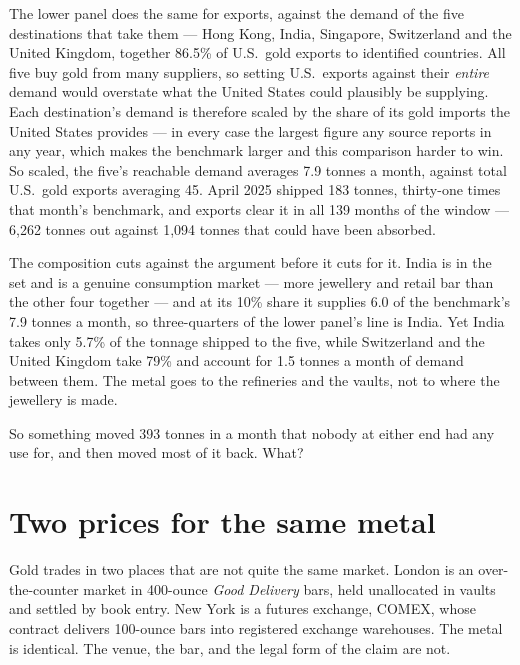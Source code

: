 \documentclass[11pt]{article}
\begin{document}
The lower panel does the same for exports, against the demand of the five
destinations that take them --- Hong Kong, India, Singapore, Switzerland and
the United Kingdom, together 86.5\% of U.S.\ gold exports to identified
countries. All five buy gold from many suppliers, so setting U.S.\ exports
against their \emph{entire} demand would overstate what the United States could
plausibly be supplying. Each destination's demand is therefore scaled by the
share of its gold imports the United States provides --- in every case the
largest figure any source reports in any year, which makes the benchmark larger
and this comparison harder to win. So scaled, the five's
reachable demand averages 7.9 tonnes a month, against total U.S.\ gold exports
averaging 45. April 2025 shipped 183 tonnes, thirty-one times that month's
benchmark, and exports clear it in all 139 months of the window --- 6,262
tonnes out against 1,094 tonnes that could have been absorbed.

The composition cuts against the argument before it cuts for it. India is in the
set and is a genuine consumption market --- more jewellery and retail bar than
the other four together --- and at its 10\% share it supplies 6.0 of the
benchmark's 7.9 tonnes a month, so three-quarters of the lower panel's line is
India. Yet India takes only 5.7\% of the tonnage shipped to the five, while
Switzerland and the United Kingdom take 79\% and account for 1.5 tonnes a month
of demand between them. The metal goes to the refineries and the vaults, not to
where the jewellery is made.

So something moved 393 tonnes in a month that nobody at either end had any use
for, and then moved most of it back. What?

\section{Two prices for the same metal}

Gold trades in two places that are not quite the same market. London is an
over-the-counter market in 400-ounce \textit{Good Delivery} bars, held
unallocated in vaults and settled by book entry. New York is a futures
exchange, COMEX, whose contract delivers 100-ounce bars into registered
exchange warehouses. The metal is identical. The venue, the bar, and the legal
form of the claim are not.
\end{document}

